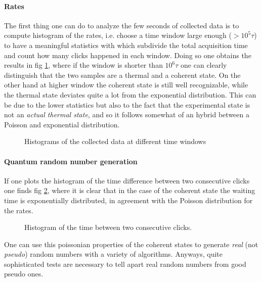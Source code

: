 \documentclass[a4paper, 11pt]{article}
\begin{document}
    \paragraph{Rates}
      The first thing one can do to analyze the few seconds of collected data is to compute histogram of the rates, i.e. choose a time window large enough ($>10^5\tau$) to have a meaningful statistics with which subdivide the total acquisition time and count how many clicks happened in each window. Doing so one obtains the results in fig \ref{fig:rates}, where if the window is shorter than $10^6\tau$ one can clearly distinguish that the two samples are a thermal and a coherent state. On the other hand at higher window the coherent state is still well recognizable, while the thermal state deviates quite a lot from the exponential distribution. This can be due to the lower statistics but also to the fact that the experimental state is not an \emph{actual thermal state}, and so it follows somewhat of an hybrid between a Poisson and exponential distribution.

      \begin{figure}[H]
        \centering
        \caption{Histograms of the collected data at different time windows}
        \label{fig:rates}
      \end{figure}

    \paragraph{Quantum random number generation}
      If one plots the histogram of the time difference between two consecutive clicks one finds fig \ref{fig:time_difference}, where it is clear that in the case of the coherent state the waiting time is exponentially distributed, in agreement with the Poisson distribution for the rates.

      \begin{figure}[H]
        \centering
        \caption{Histogram of the time between two consecutive clicks.}
        \label{fig:time_difference}
      \end{figure}

      One can use this poissonian properties of the coherent states to generate \emph{real} (not \emph{pseudo}) random numbers with a variety of algorithms.
      Anyways, quite sophisticated tests are necessary to tell apart real random numbers from good pseudo ones.
\end{document}
